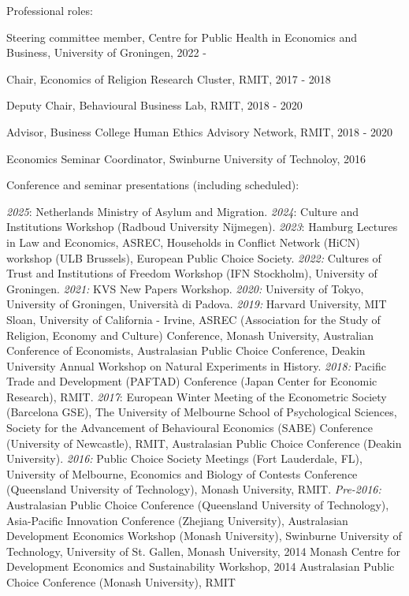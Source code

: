 \documentclass[letterpaper]{article}
\renewenvironment{itemize}{
  \begin{list}{}{
    \setlength{\leftmargin}{1.5em}
  }
}{
  \end{list}
}
\begin{document}
\begin{itemize}
	
		\item Professional roles:
	\begin{itemize}
			\item Steering committee member, Centre for Public Health in Economics and Business, University of Groningen, 2022 -
		\item Chair, Economics of Religion Research Cluster, RMIT, 2017 - 2018
		\item  Deputy Chair, Behavioural Business Lab, RMIT, 2018 - 2020
		\item Advisor, Business College Human Ethics Advisory Network, RMIT, 2018 - 2020
		\item Economics Seminar Coordinator, Swinburne University of Technoloy, 2016
	\end{itemize}


	\item Conference and seminar presentations (including scheduled):
	\begin{itemize}
		\item \textit{2025}: Netherlands Ministry of Asylum and Migration. \textit{2024}: Culture and Institutions Workshop (Radboud University Nijmegen). \textit{2023}: Hamburg Lectures in Law and Economics, ASREC, Households in Conflict Network (HiCN) workshop (ULB Brussels), European Public Choice Society. \textit{2022:}  Cultures of Trust and Institutions of Freedom Workshop (IFN Stockholm), University of Groningen. \textit{2021:} KVS New Papers Workshop. \textit{2020:} University of Tokyo, University of Groningen, Università di Padova. \textit{2019:} Harvard University, MIT Sloan, University of California - Irvine, ASREC (Association for the Study of Religion, Economy and Culture) Conference, Monash University, Australian Conference of Economists, Australasian Public Choice Conference, Deakin University Annual Workshop on Natural Experiments in History.  \textit{2018:} Pacific Trade and Development (PAFTAD) Conference (Japan Center for Economic Research), RMIT. \textit{2017}: European Winter Meeting of the Econometric Society (Barcelona GSE), The University of Melbourne School of Psychological Sciences, Society for the Advancement of Behavioural Economics (SABE) Conference (University of Newcastle), RMIT, Australasian Public Choice Conference (Deakin University). \textit{2016:} Public Choice Society Meetings (Fort Lauderdale, FL), University of Melbourne, Economics and Biology of Contests Conference (Queensland University of Technology), Monash University, RMIT. \textit{Pre-2016: }Australasian Public Choice Conference (Queensland University of Technology), Asia-Pacific Innovation Conference (Zhejiang University), Australasian Development Economics Workshop (Monash University), Swinburne University of Technology, University of St. Gallen, Monash University, 2014 Monash Centre for Development Economics and Sustainability Workshop, 2014 Australasian Public Choice Conference (Monash University), RMIT
	\end{itemize}
	

\end{itemize}
\end{document}
